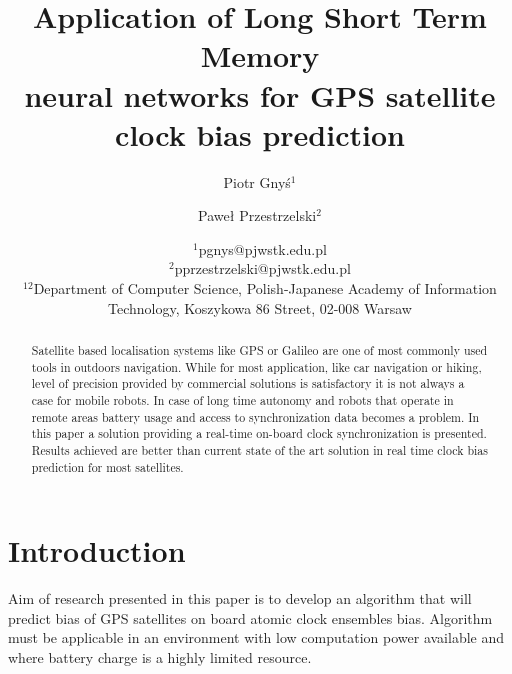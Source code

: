 \documentclass{article}
\begin{document}
\pagestyle{myheadings}
\title{Application of Long Short Term Memory \\  neural  networks for GPS satellite \\ clock 
bias prediction}

\author{ }
\author{Piotr Gny\'{s}$^1$ \and Pawe\l{} Przestrzelski$^2$}
\date{%
    $^1$pgnys@pjwstk.edu.pl \\%
    $^2$pprzestrzelski@pjwstk.edu.pl \\%
	$^12$Department of Computer Science,  Polish-Japanese Academy of 
	Information Technology, Koszykowa 86 Street, 02-008 Warsaw \\%
}


\maketitle

\begin{abstract}
Satellite based localisation systems like GPS or Galileo are one of most commonly used tools
in outdoors navigation. While for most application, like car navigation or hiking, level of
precision provided by commercial solutions is satisfactory it is not always a case for mobile
robots. In case of long time autonomy and robots that operate in remote areas battery usage
and access to synchronization data becomes a problem. In this paper a solution providing a 
real-time on-board clock synchronization is presented. Results achieved are better than current
state of the art solution in real time clock bias prediction for most satellites.
\end{abstract}



\section{Introduction}
Aim of research presented in this paper is to develop an algorithm that will predict bias of
GPS satellites on board atomic clock ensembles bias. Algorithm must be applicable in an 
environment with low computation power available and where battery charge is a highly limited
resource.

\end{document}
